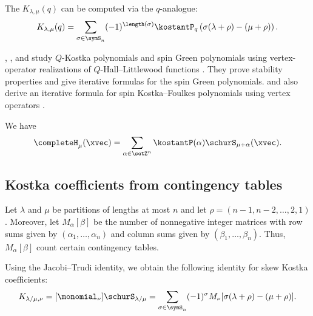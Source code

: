 The \label{kostkaFoulkesPolynomial}
$K_{\lambda,\mu}(q)$ can be computed via the $q$-analogue:
\[
K_{\lambda,\mu}(q) = \sum_{\sigma \in \symS_n}
(-1)^{\length(\sigma)} \kostantP_q\left( \sigma(\lambda + \rho) - (\mu+\rho) \right).
\]

, , and  study
$Q$-Kostka polynomials and spin Green polynomials using vertex-operator
realizations of $Q$-Hall--Littlewood functions \cite{JiangJingLiu2023}.  They
prove stability properties and give iterative formulas for the spin Green
polynomials.   and  also derive an iterative
formula for spin Kostka--Foulkes polynomials using vertex operators
\cite{JingLiu2023}.

\begin{theorem}
We have
\[
\completeH_\mu(\xvec) = \sum_{\alpha \in \setZ^n} \kostantP(\alpha)\schurS_{\mu + \alpha}(\xvec).
\]
\end{theorem}


\subsection[kostkaFromContingency]{Kostka coefficients from contingency tables}

Let $\lambda$ and $\mu$ be partitions of lengths at most $n$
and let $\rho = (n-1,n-2,\dotsc,2,1)$.
Moreover, let $M_\alpha[\beta]$ be the number of nonnegative integer matrices
with row sums given by $(\alpha_1,\dotsc,\alpha_n)$
and column sums given by $(\beta_1,\dotsc,\beta_n)$.
Thus, $M_\alpha[\beta]$ count certain contingency tables.

Using the Jacobi--Trudi identity, we obtain the following identity for skew
Kostka coefficients:
\[
 K_{\lambda/\mu,\nu} = [\monomial_\nu] \schurS_{\lambda/\mu} = 
 \sum_{\sigma \in \symS_n} 
   (-1)^\sigma M_\nu[\sigma(\lambda+\rho) - (\mu+\rho)].
\]


